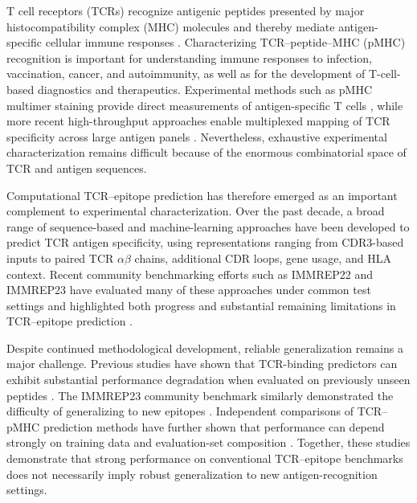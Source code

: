 \documentclass{article}
\begin{document}
T cell receptors (TCRs) recognize antigenic peptides presented by major
histocompatibility complex (MHC) molecules and thereby mediate
antigen-specific cellular immune responses
\cite{garcia05}. Characterizing TCR--peptide--MHC (pMHC) recognition is
important for understanding immune responses to infection, vaccination,
cancer, and autoimmunity, as well as for the development of T-cell-based
diagnostics and therapeutics. Experimental methods such as pMHC multimer
staining provide direct measurements of antigen-specific T cells
\cite{dolton14}, while more recent high-throughput approaches enable
multiplexed mapping of TCR specificity across large antigen panels
\cite{wenzhangFrameworkHighlyMultiplexed2021,joglekar2021t}.
Nevertheless, exhaustive experimental characterization remains difficult
because of the enormous combinatorial space of TCR and antigen sequences.

Computational TCR--epitope prediction has therefore emerged as an important
complement to experimental characterization. Over the past decade, a broad
range of sequence-based and machine-learning approaches have been developed
to predict TCR antigen specificity, using representations ranging from
CDR3-based inputs to paired TCR $\alpha\beta$ chains, additional CDR loops,
gene usage, and HLA context. Recent community benchmarking efforts such as
IMMREP22 and IMMREP23 have evaluated many of these approaches under common
test settings and highlighted both progress and substantial remaining
limitations in TCR--epitope prediction
\cite{nielsen24,meysman23}.

Despite continued methodological development, reliable generalization
remains a major challenge. Previous studies have shown that TCR-binding
predictors can exhibit substantial performance degradation when evaluated on
previously unseen peptides
\cite{grazioli2022tcr}. The IMMREP23 community benchmark similarly
demonstrated the difficulty of generalizing to new epitopes
\cite{nielsen24}. Independent comparisons of TCR--pMHC prediction
methods have further shown that performance can depend strongly on training
data and evaluation-set composition
\cite{lu2026assessment}.
Together, these studies demonstrate that strong performance on conventional
TCR--epitope benchmarks does not necessarily imply robust generalization to
new antigen-recognition settings.
\end{document}
